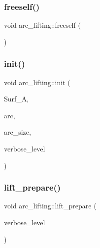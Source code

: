 \mbox{\label{classarc__lifting_a9a3598d6e4f101d1645eac48838fbea9}} 
\subsubsection{\texorpdfstring{freeself()}{freeself()}}
{\footnotesize\ttfamily void arc\+\_\+lifting\+::freeself (\begin{DoxyParamCaption}{ }\end{DoxyParamCaption})}

\mbox{\label{classarc__lifting_a11fc382addd05e0bbe8b0b44dcd4c55e}} 
\subsubsection{\texorpdfstring{init()}{init()}}
{\footnotesize\ttfamily void arc\+\_\+lifting\+::init (\begin{DoxyParamCaption}\item[{\mbox{\hyperlink{classsurface__with__action}{surface\+\_\+with\+\_\+action}} $\ast$}]{Surf\+\_\+A,  }\item[{\mbox{\hyperlink{galois_8h_a09fddde158a3a20bd2dcadb609de11dc}{I\+NT}} $\ast$}]{arc,  }\item[{\mbox{\hyperlink{galois_8h_a09fddde158a3a20bd2dcadb609de11dc}{I\+NT}}}]{arc\+\_\+size,  }\item[{\mbox{\hyperlink{galois_8h_a09fddde158a3a20bd2dcadb609de11dc}{I\+NT}}}]{verbose\+\_\+level }\end{DoxyParamCaption})}

\mbox{\label{classarc__lifting_a5faae15fa91aadc062307cafedd52286}} 
\subsubsection{\texorpdfstring{lift\+\_\+prepare()}{lift\_prepare()}}
{\footnotesize\ttfamily void arc\+\_\+lifting\+::lift\+\_\+prepare (\begin{DoxyParamCaption}\item[{\mbox{\hyperlink{galois_8h_a09fddde158a3a20bd2dcadb609de11dc}{I\+NT}}}]{verbose\+\_\+level }\end{DoxyParamCaption})}

